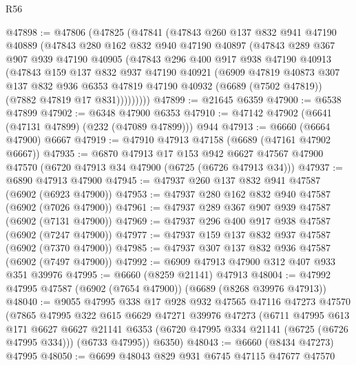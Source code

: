 \begin{lexlean}{R56}
\begin{coremodule}
@47898 := @47806
    (@47825
      (@47841
        (@47843
          @260
          @137
          @832
          @941
          @47190
          @40889
          (@47843
            @280
            @162
            @832
            @940
            @47190
            @40897
            (@47843
              @289
              @367
              @907
              @939
              @47190
              @40905
              (@47843
                @296
                @400
                @917
                @938
                @47190
                @40913
                (@47843
                  @159
                  @137
                  @832
                  @937
                  @47190
                  @40921
                  (@6909
                    @47819
                    @40873
                    @307
                    @137
                    @832
                    @936
                    @6353
                    @47819
                    @47190
                    @40932
                    (@6689 (@7502 @47819))
                    (@7882 @47819 @17 @831)))))))))
@47899 := @21645 @6359
@47900 := @6538 @47899
@47902 := @6348 @47900 @6353
@47910 := @47142 @47902 (@6641 (@47131 @47899) (@232 (@47089 @47899))) @944
@47913 := @6660 (@6664 @47900) @6667
@47919 := @47910 @47913 @47158 (@6689 (@47161 @47902 @6667))
@47935 := @6870
    @47913
    @17
    @153
    @942
    @6627
    @47567
    @47900
    @47570
    (@6720 @47913 @34 @47900 (@6725 (@6726 @47913 @34)))
@47937 := @6890 @47913 @47900
@47945 := @47937 @260 @137 @832 @941 @47587 (@6902 (@6923 @47900))
@47953 := @47937 @280 @162 @832 @940 @47587 (@6902 (@7026 @47900))
@47961 := @47937 @289 @367 @907 @939 @47587 (@6902 (@7131 @47900))
@47969 := @47937 @296 @400 @917 @938 @47587 (@6902 (@7247 @47900))
@47977 := @47937 @159 @137 @832 @937 @47587 (@6902 (@7370 @47900))
@47985 := @47937 @307 @137 @832 @936 @47587 (@6902 (@7497 @47900))
@47992 := @6909 @47913 @47900 @312 @407 @933 @351 @39976
@47995 := @6660 (@8259 @21141) @47913
@48004 := @47992 @47995 @47587 (@6902 (@7654 @47900)) (@6689 (@8268 @39976 @47913))
@48040 := @9055
    @47995
    @338
    @17
    @928
    @932
    @47565
    @47116
    @47273
    @47570
    (@7865
      @47995
      @322
      @615
      @6629
      @47271
      @39976
      @47273
      (@6711
        @47995
        @613
        @171
        @6627
        @6627
        @21141
        @6353
        (@6720 @47995 @334 @21141 (@6725 (@6726 @47995 @334)))
        (@6733 @47995))
      @6350)
@48043 := @6660 (@8434 @47273) @47995
@48050 := @6699 @48043 @829 @931 @6745 @47115 @47677 @47570

\end{coremodule}
\end{lexlean}
